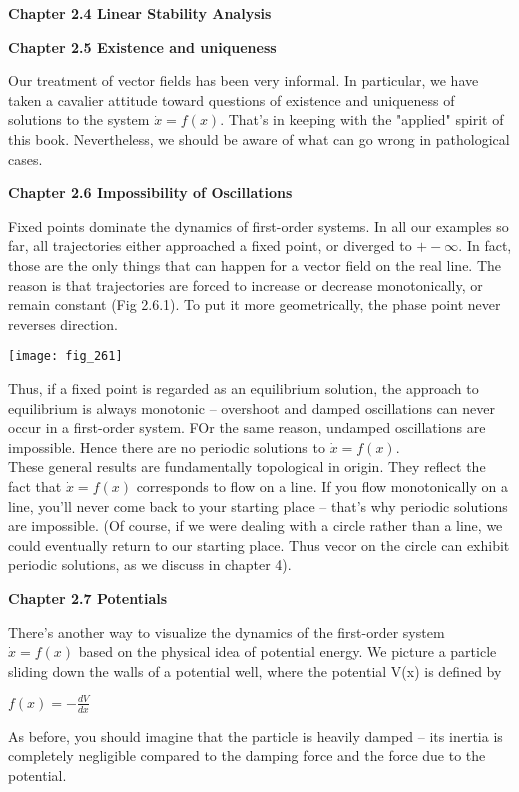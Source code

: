 \documentclass{article}
\begin{document}
\textbf {Chapter 2.4 Linear Stability Analysis}

\textbf {Chapter 2.5 Existence and uniqueness}

Our treatment of vector fields has been very informal. In particular, we have taken a cavalier attitude toward questions of existence and uniqueness of solutions to the system $\dot{x} = f(x)$. That's in keeping with the "applied" spirit of this book. Nevertheless, we should be aware of what can go wrong in pathological cases.

\textbf {Chapter 2.6 Impossibility of Oscillations}

Fixed points dominate the dynamics of first-order systems. In all our examples so far, all trajectories either approached a fixed point, or diverged to $+- \infty$. In fact, those are the only things that can happen for a vector field on the real line. The reason is that trajectories are forced to increase or decrease monotonically, or remain constant (Fig 2.6.1). To put it more geometrically, the phase point never reverses direction.

\texttt{[image: fig\_261]}

Thus, if a fixed point is regarded as an equilibrium solution, the approach to equilibrium is always monotonic -- overshoot and damped oscillations can never occur in a first-order system. FOr the same reason, undamped oscillations are impossible. Hence there are no periodic solutions to $\dot{x} = f(x)$. \\
These general results are fundamentally topological in origin. They reflect the fact that $\dot{x} = f(x)$ corresponds to flow on a line. If you flow monotonically on a line, you'll never come back to your starting place -- that's why periodic solutions are impossible. (Of course, if we were dealing with a circle rather than a line, we could eventually return to our starting place. Thus vecor on the circle can exhibit periodic solutions, as we discuss in chapter 4).

\textbf {Chapter 2.7 Potentials}

There's another way to visualize the dynamics of the first-order system $\dot{x} = f(x)$ based on the physical idea of potential energy. We picture a particle sliding down the walls of a potential well, where the potential V(x) is defined by 
\begin{center}
$f(x) = - \frac{dV}{dx}$
\end{center}
As before, you should imagine that the particle is heavily damped -- its inertia is completely negligible compared to the damping force and the force due to the potential.
\end{document}
